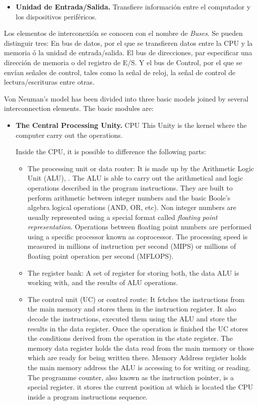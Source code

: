 \begin{paracol}{2}
\begin{itemize}
\item \textbf{Unidad de Entrada/Salida.} Transfiere información entre el computador y los dispositivos periféricos.
\end{itemize}

Los elementos de interconexión se conocen con el nombre de \emph{Buses}. Se pueden distinguir tres: En bus de datos, por el que se transfieren datos entre la CPU y la memoria ó la unidad de entrada/salida. El bus de direcciones, par especificar una dirección de memoria o del registro de E/S. Y el bus de Control, por el que se envían señales de control, tales como la señal de reloj, la señal de control de lectura/escrituras entre otras.

\switchcolumn
Von Neuman's model has been divided into three basic models joined by several interconnection elements. The basic modules are: 

\begin{itemize}
\item \textbf{The Central Processing Unity.} CPU  This Unity is the kernel where the computer carry out the operations. 

Inside the CPU, it is possible to difference the following parts:

\begin{itemize}

\item The processing unit or data router: It is made up by the Arithmetic Logic Unit (ALU), . The ALU is able to carry out the arithmetical and logic operations described in the program instructions. They are built to perform arithmetic between integer numbers and the basic Boole's algebra logical operations (AND, OR, etc). Non integer numbers are usually represented using a special format called \emph{floating point representation}. Operations between floating point numbers are performed using a specific processor known as coprocessor. The processing speed is measured in millions of instruction per second (MIPS) or millions of floating point operation per second (MFLOPS).

\item The register bank: A set of register for storing both, the data ALU is working with, and the results of ALU operations.
 
\item The control unit (UC) or control route: It fetches the instructions from the main memory and stores them in the instruction register. It also decode the instructions, executed them using the ALU and store the results in the data register. Once the operation is finished the UC stores the conditions derived from the operation in the state register. The memory data register holds the data read from the main memory or those which are ready for being written there. Memory Address register holds the main memory address the ALU is accessing to for writing or reading. The programme counter, also known as the instruction pointer, is a special register. it stores the current position at which is located the CPU inside a program instructions sequence.    
\end{itemize}
 


\end{itemize}
\end{paracol}
